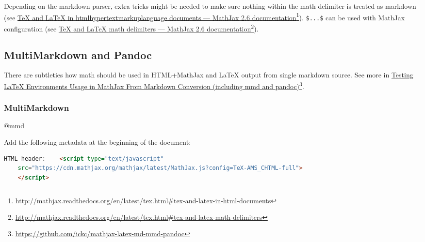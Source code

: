 Depending on the markdown parser, extra tricks might be needed to make sure nothing within the math delimiter is treated as markdown (see \href{http://mathjax.readthedocs.org/en/latest/tex.html#tex-and-latex-in-html-documents}{TeX and LaTeX in \ac{htmlhypertextmarkuplanguage} documents — MathJax 2.6 documentation}\footnote{\href{http://mathjax.readthedocs.org/en/latest/tex.html\#tex-and-latex-in-html-documents}{http:/\slash mathjax.readthedocs.org\slash en\slash latest\slash tex.html\#tex-and-latex-in-html-documents}}). \texttt{\$...\$} can be used with MathJax configuration (see \href{http://mathjax.readthedocs.org/en/latest/tex.html#tex-and-latex-math-delimiters}{TeX and LaTeX math delimiters — MathJax 2.6 documentation}\footnote{\href{http://mathjax.readthedocs.org/en/latest/tex.html\#tex-and-latex-math-delimiters}{http:/\slash mathjax.readthedocs.org\slash en\slash latest\slash tex.html\#tex-and-latex-math-delimiters}}).

\subsection{MultiMarkdown and Pandoc}
\label{multimarkdownandpandoc}

There are subtleties how math should be used in HTML+MathJax and LaTeX output from single markdown source. See more in \href{https://github.com/ickc/mathjax-latex-md-mmd-pandoc}{Testing LaTeX Environments Usage in MathJax From Markdown Conversion (including mmd and pandoc)}\footnote{\href{https://github.com/ickc/mathjax-latex-md-mmd-pandoc}{https:/\slash github.com\slash ickc\slash mathjax-latex-md-mmd-pandoc}}.

\subsubsection{MultiMarkdown}
\label{multimarkdown}

@mmd

Add the following metadata at the beginning of the document:

\begin{adjustwidth}{2.5em}{2.5em}
\begin{lstlisting}[language=html]
HTML header:    <script type="text/javascript"
    src="https://cdn.mathjax.org/mathjax/latest/MathJax.js?config=TeX-AMS_CHTML-full">
    </script>

\end{lstlisting}
\end{adjustwidth}

